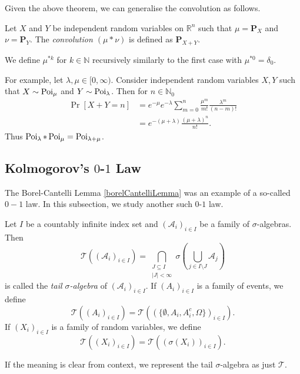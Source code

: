 Given the above theorem, we can generalise the convolution as follows.

\begin{definition}
    Let $X$ and $Y$ be independent random variables on $\mathbb{R}^n$ such that $\mu=\textbf{P}_X$ and $\nu=\textbf{P}_Y$. The \textit{convolution $(\mu * \nu)$} is defined as $\textbf{P}_{X+Y}$.
\end{definition}

We define $\mu^{*k}$ for $k\in\mathbb{N}$ recursively similarly to the first case with $\mu^{*0}=\delta_0$.

\vspace{2mm}
For example, let $\lambda,\mu\in[0,\infty)$. Consider independent random variables $X,Y$ such that $X\sim\operatorname{Poi}_\mu$ and $Y\sim\operatorname{Poi}_\lambda$. Then for $n\in\mathbb{N}_0$
\begin{align*}
    \Pr[X+Y=n] &= e^{-\mu}e^{-\lambda}\sum_{m=0}^n \frac{\mu^m}{m!}\frac{\lambda^m}{(n-m)!} \\
    &= e^{-(\mu+\lambda)}\frac{(\mu+\lambda)^n}{n!}.
\end{align*}
Thus $\operatorname{Poi}_\lambda * \operatorname{Poi}_\mu = \operatorname{Poi}_{\lambda+\mu}$.

\subsection{Kolmogorov's \texorpdfstring{$0$}{TEXT}-\texorpdfstring{$1$}{TEXT} Law}

The Borel-Cantelli Lemma \ref{borelCantelliLemma} was an example of a so-called $0-1$ law. In this subsection, we study another such $0$-$1$ law.

\begin{definition}
    Let $I$ be a countably infinite index set and $(\mathcal{A}_i)_{i\in I}$ be a family of $\sigma$-algebras. Then
    $$\mathcal{T}((\mathcal{A}_i)_{i\in I})=\bigcap_{\substack{J\subseteq I \\ |J|<\infty}} \sigma\left(\bigcup_{j\in I\setminus J}\mathcal{A}_j\right)$$
    is called the \textit{tail $\sigma$-algebra} of $(\mathcal{A}_i)_{i\in I}$. If $(A_i)_{i\in I}$ is a family of events, we define
    $$\mathcal{T}((A_i)_{i\in I}) = \mathcal{T}((\{\emptyset,A_i,A_i^c,\Omega\})_{i\in I}).$$
    If $(X_i)_{i\in I}$ is a family of random variables, we define
    $$\mathcal{T}((X_i)_{i\in I}) = \mathcal{T}((\sigma(X_i))_{i\in I}).$$
\end{definition}

If the meaning is clear from context, we represent the tail $\sigma$-algebra as just $\mathcal{T}$.

